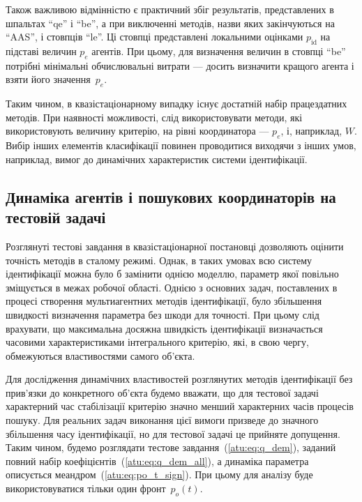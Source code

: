 Також важливою відмінністю є практичний збіг результатів,
представлених в шпальтах ``qe'' і ``be'', а при виключенні методів,
назви яких закінчуються на ``AAS'', і стовпців ``le''. Ці стовпці
представлені локальними оцінками
$ p_\mathrm{id} $ на підставі величин
$ p_e $ агентів. При цьому, для визначення величин в стовпці ``be''
потрібні мінімальні обчислювальні витрати --- досить визначити
кращого агента і взяти його значення~$ p_e $.

Таким чином, в квазістаціонарному випадку існує достатній набір працездатних
методів. При наявності можливості, слід використовувати методи, які
використовують величину критерію, на рівні координатора --- $p_e$, і,
наприклад, $W$. Вибір інших елементів класифікації повинен проводитися
виходячи з інших умов, наприклад, вимог до динамічних характеристик системи
ідентифікації.



\subsection{Динаміка агентів і пошукових координаторів на тестовій задачі}%

Розглянуті тестові завдання в квазістаціонарної постановці
дозволяють оцінити точність методів в сталому режимі. Однак, в
таких умовах всю систему ідентифікації можна було б замінити
однією моделлю, параметр якої повільно зміщується в межах
робочої області. Однією з основних задач, поставлених в
процесі створення мультиагентних методів ідентифікації,
було збільшення швидкості визначення параметра без шкоди
для точності. При цьому слід врахувати, що максимальна
досяжна швидкість ідентифікації визначається часовими
характеристиками інтегрального критерію, які, в свою чергу,
обмежуються властивостями самого об'єкта.

Для дослідження динамічних властивостей розглянутих методів ідентифікації без
прив'язки до конкретного об'єкта будемо вважати, що для тестової задачі
характерний час стабілізації критерію значно менший характерних часів процесів
пошуку.
%
Для реальних задач виконання цієї вимоги призведе до
значного збільшення часу ідентифікації, но для тестової задачі
це прийняте допущення.
%
Таким чином, будемо розглядати тестове завдання~(\ref{atu:eq:q_dem}),
заданий повний набір коефіцієнтів~(\ref{atu:eq:q_dem_all}),
а динаміка параметра описується меандром~(\ref{atu:eq:po_t_sign}).
При цьому для аналізу буде використовуватися тільки один фронт~$p_o(t)$.

